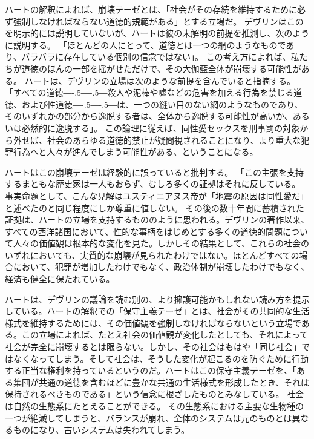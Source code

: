 \documentclass[paper=a4,book,openany]{jlreq}
\newcommand{\ig}[1]{}           %
\def\DDASH{―\kern-.5\zw―\kern-.5\zw―} %
\begin{document}
ハートの解釈によれば、崩壊テーゼとは、「社会がその存続を維持するために必ず強制しなければならない道徳的規範がある」とする立場だ。
デヴリン\ig{Patrick Devlin}はこのを明示的には説明していないが、ハートは彼の未解明の前提を推測し、次のように説明する。
「ほとんどの人にとって、道徳とは一つの網のようなものであり、バラバラに存在している個別の信念ではない」\citep[pp.50--51]{hart63:_law_liber_and_moral}。
この考え方によれば、私たちが道徳のほんの一部を揺がせただけで、その大伽藍全体が崩壊する可能性がある。
ハートは、デヴリン\ig{Patrick Devlin}の立場は次のような前提を含んでいると指摘する。
「すべての道徳{\DDASH}殺人や泥棒や嘘などの危害を加える行為を禁じる道徳、および性道徳{\DDASH}は、一つの縫い目のない網のようなものであり、そのいずれかの部分から逸脱する者は、全体から逸脱する可能性が高いか、あるいは必然的に逸脱する」\citep[p.50]{hart63:_law_liber_and_moral}。
この論理に従えば、同性愛セックスを刑事罰の対象から外せば、社会のあらゆる道徳的禁止が疑問視されることになり、より重大な犯罪行為へと人々が進んでしまう可能性がある、ということになる。

ハートはこの崩壊テーゼは経験的に誤っていると批判する。
「この主張を支持するまともな歴史家は一人もおらず、むしろ多くの証拠はそれに反している。
事実命題として、こんな見解はユスティニアヌス帝が「地震の原因は同性愛だ」と述べたのと同じ程度にしか尊重に値しない\citep[p.4]{hart63:_law_liber_and_moral}。
その後の数十年間に蓄積された証拠は、ハートの立場を支持するもののように思われる。デヴリン\ig{Patrick Devlin}の著作以来、すべての西洋諸国において、性的な事柄をはじめとする多くの道徳的問題について人々の価値観は根本的な変化を見た。しかしその結果として、これらの社会のいずれにおいても、実質的な崩壊が見られたわけではない。ほとんどすべての場合において、犯罪が増加したわけでもなく、政治体制が崩壊したわけでもなく、経済も健全に保たれている。

ハートは、デヴリンの議論を読む別の、より擁護可能かもしれない読み方を提示している。ハートの解釈での「保守主義テーゼ」とは、社会がその共同的な生活様式を維持するためには、その価値観を強制しなければならないという立場である。この立場によれば、たとえ社会の価値観が変化したとしても、それによって社会が完全に崩壊するとは限らない。しかし、その社会はもはや「同じ社会」ではなくなってしまう。そして社会は、そうした変化が起こるのを防ぐために行動する正当な権利を持っているというのだ。ハートはこの保守主義テーゼを、「ある集団が共通の道徳を含むほどに豊かな共通の生活様式を形成したとき、それは保持されるべきものである」という信念に根ざしたものとみなしている\citep[p.4]{hart63:_law_liber_and_moral}。
社会は自然の生態系にたとえることができる。
その生態系における主要な生物種の一つが絶滅してしまうと、バランスが崩れ、全体のシステムは元のものとは異なるものになり、古いシステムは失われてしまう。
\end{document}
